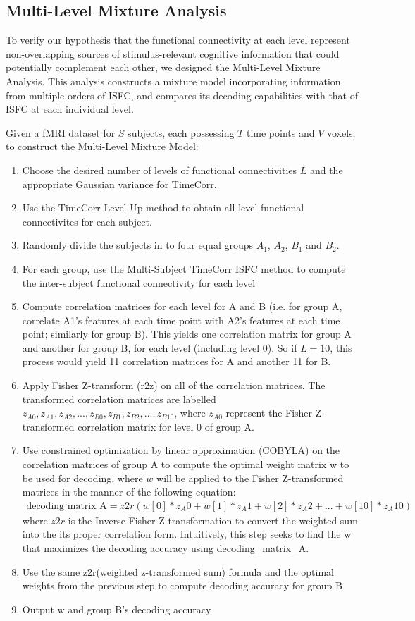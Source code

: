\documentclass[11pt]{article}
\begin{document}
\subsection{Multi-Level Mixture Analysis}
To verify our hypothesis that the functional connectivity at each level represent non-overlapping sources of stimulus-relevant cognitive information that could potentially complement each other, we designed the Multi-Level Mixture Analysis. This analysis constructs a mixture model incorporating information from multiple orders of ISFC, and compares its decoding capabilities with that of ISFC at each individual level.

Given a fMRI dataset for $S$ subjects, each possessing $T$ time points and $V$ voxels, to construct the Multi-Level Mixture Model:
\begin{enumerate}
\item Choose the desired number of levels of functional connectivities $L$ and the appropriate Gaussian variance for TimeCorr.
\item Use the TimeCorr Level Up method to obtain all level functional connectivites for each subject.
\item Randomly divide the subjects in to four equal groups $A_1$, $A_2$, $B_1$ and $B_2$.
\item For each group, use the Multi-Subject TimeCorr ISFC method to compute the inter-subject functional connectivity for each level
\item Compute correlation matrices for each level for A and B (i.e. for group A, correlate A1's features at each time point with A2's features at each time point; similarly for group B). This yields one correlation matrix for group A and another for group B, for each level (including level 0). So if $L=10$, this process would yield 11 correlation matrices for A and another 11 for B.
\item Apply Fisher Z-transform (r2z) on all of the correlation matrices. The transformed correlation matrices are labelled $z_{A0}, z_{A1}, z_{A2}, ..., z_{B0}, z_{B1}, z_{B2}, ..., z_{B10}$, where $z_{A0}$ represent the Fisher Z-transformed correlation matrix for level 0 of group A.
\item Use constrained optimization by linear approximation (COBYLA) on the correlation matrices of group A to compute the optimal weight matrix w to be used for decoding, where $w$ will be applied to the Fisher Z-transformed matrices in the manner of the following equation:
\begin{align*}
\text{decoding\_matrix\_A} = z2r(w[0]*z_A0 + w[1]*z_A1 + w[2]*z_A2 + ... + w[10]*z_A10)
\end{align*}
where $z2r$ is the Inverse Fisher Z-transformation to convert the weighted sum into the its proper correlation form. Intuitively, this step seeks to find the w that maximizes the decoding accuracy using decoding\_matrix\_A.
\item Use the same z2r(weighted z-transformed sum) formula and the optimal weights from the previous step to compute decoding accuracy for group B
\item Output w and group B's decoding accuracy
\end{enumerate}
\end{document}

